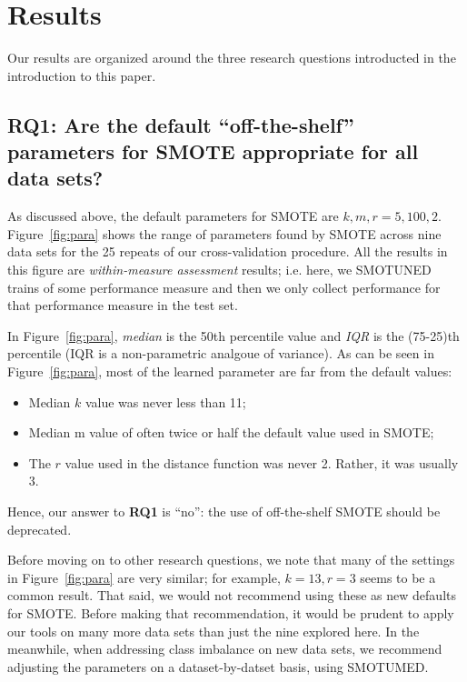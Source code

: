 \documentclass[10pt,conference]{IEEEtran}
\newcommand{\bi}{\begin{itemize}[leftmargin=0.4cm]}
\newcommand{\ei}{\end{itemize}}
\theoremstyle{break}
\theoremstyle{break}
\begin{document}
 
   

\section{Results}
\label{sect:results}

Our results are organized around the three
research questions introducted in the introduction
to this paper.

 \subsection{RQ1: Are the default ``off-the-shelf'' parameters for SMOTE appropriate for all
 data sets?}
 
 
 As discussed above, the default parameters for
 SMOTE are $k,m,r = 5,100,2$.
  Figure~\ref{fig:para} shows the range of parameters
 found by SMOTE across  nine data sets for the 25 repeats of our cross-validation procedure.
 All the results in this figure are {\em within-measure assessment} results; i.e.
 here, we SMOTUNED trains of some performance measure and then we only collect performance for that performance measure in the test set.
 
 
 In  Figure~\ref{fig:para}, {\em median} is the 50th percentile
 value and {\em IQR} is the (75-25)th percentile
 (IQR is a non-parametric analgoue of variance).
 As can be seen in Figure~\ref{fig:para}, most of the learned parameter are far from the default values:
 \bi
 \item 
 Median $k$ value was never less than 11;
 \item
 Median m value of often twice or half the default value used in SMOTE;
 \item
 The $r$ value used in the distance function was never 2. Rather, it was usually 3.
 \ei
 Hence,  our answer to {\bf RQ1} is ``no'': the use of off-the-shelf SMOTE should be deprecated. 
   
Before moving on to other research questions, we note that many of the settings in Figure~\ref{fig:para} are very similar; for example, $k=13,r=3$ seems to be a common
result.  That said, we would not recommend using these as new defaults for SMOTE. Before making that recommendation, it would be prudent to   apply
our tools    on many more data sets than just the nine explored here. In the meanwhile, when addressing class imbalance on new data sets, we recommend adjusting the parameters on a dataset-by-datset basis, using SMOTUMED.
\end{document}
